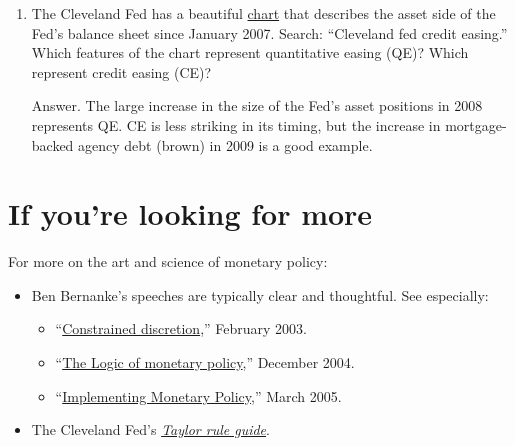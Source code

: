 \begin{enumerate}
%

\item The Cleveland Fed has a beautiful
\href{http://www.clevelandfed.org/research/data/credit_easing/index.cfm}{chart}
that describes the asset side of the Fed's balance sheet since January 2007.
Search:  ``Cleveland fed credit easing.''
Which features of the chart represent quantitative easing (QE)?
Which represent credit easing (CE)?

Answer.
The large increase in the size of the Fed's asset positions in 2008
represents QE.
CE is less striking in its timing, but the increase in mortgage-backed
agency debt (brown) in 2009 is a good example.

\end{enumerate}


\section*{If you're looking for more}

For more on the art and science of monetary policy:
%
\begin{itemize}
\item Ben Bernanke's speeches are typically clear and thoughtful.
See especially:
\begin{itemize}
\item
``\href{http://www.federalreserve.gov/boarddocs/speeches/2003/20030203/default.htm}
{Constrained discretion},'' February 2003.

\item ``\href{http://www.federalreserve.gov/boarddocs/Speeches/2004/20041202/default.htm}
{The Logic of monetary policy},'' December 2004.

\item
``\href{http://www.federalreserve.gov/BoardDocs/Speeches/2005/20050330/default.htm}
{Implementing Monetary Policy},''
March 2005.

\end{itemize}
\item The Cleveland Fed's
\href{http://www.clevelandfed.org/Research/Com2003/0703.pdf}
{\it Taylor rule guide\/}.
\end{itemize}



